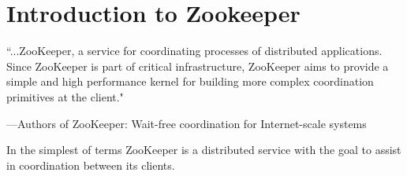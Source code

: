 \chapter{Introduction to Zookeeper}
\epigraph{``...ZooKeeper, a service for coordinating processes of distributed applications. Since ZooKeeper is part of critical infrastructure, ZooKeeper aims to provide a simple and high performance kernel for building more complex coordination primitives at the client."}{---Authors of \textup{ZooKeeper: Wait-free coordination for Internet-scale systems}}

    In the simplest of terms ZooKeeper is a distributed service with the goal to assist in coordination between its clients.